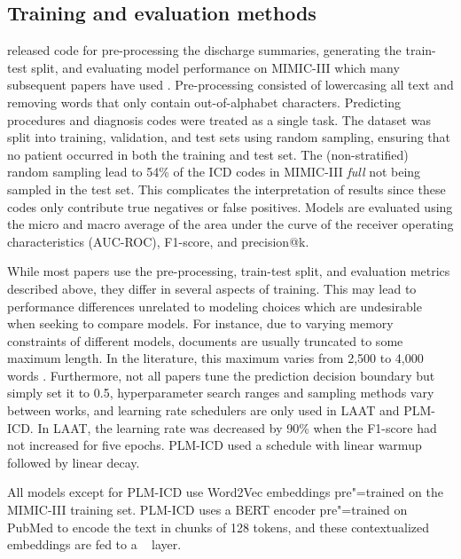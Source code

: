 {\subsection{Training and evaluation methods}\label{sec: training and evaluation methods}

\textcite{mullenbachExplainablePredictionMedical2018} released code for pre-processing the discharge summaries, generating the train-test split, and evaluating model performance on MIMIC-III which many subsequent papers have used \parencite{vuLabelAttentionModel2020, huangPLMICDAutomaticICD2022, liICDCodingClinical2020, baoMedicalCodePrediction2021, yuanCodeSynonymsMatter2022, kimReadAttendCode2021}.
Pre-processing consisted of lowercasing all text and removing words that only contain out-of-alphabet characters. Predicting procedures and diagnosis codes were treated as a single task.
The dataset was split into training, validation, and test sets using random sampling, ensuring that no patient occurred in both the training and test set. The (non-stratified) random sampling lead to 54\% of the ICD codes in MIMIC-III \textit{full} not being sampled in the test set. This complicates the interpretation of results since these codes only contribute true negatives or false positives. 
Models are evaluated using the micro and macro average of the area under the curve of the receiver operating characteristics (AUC-ROC), F1-score, and precision@k. 

While most papers use the pre-processing, train-test split, and evaluation metrics described above, they differ in several aspects of training. This may lead to performance differences unrelated to modeling choices which are undesirable when seeking to compare models. 
For instance, due to varying memory constraints of different models, documents are usually truncated to some maximum length. In the literature, this maximum varies from 2,500 to 4,000 words \parencite{mullenbachExplainablePredictionMedical2018, vuLabelAttentionModel2020, huangPLMICDAutomaticICD2022}.
Furthermore, not all papers tune the prediction decision boundary but simply set it to 0.5,
 hyperparameter search ranges and sampling methods  vary between works, and learning rate schedulers are only used in LAAT and PLM-ICD\parencite{mullenbachExplainablePredictionMedical2018, liICDCodingClinical2020}. In LAAT, the learning rate was decreased by 90\% when the F1-score had not increased for five epochs. PLM-ICD used a schedule with linear warmup followed by linear decay. 

All models except for PLM-ICD use Word2Vec embeddings pre"=trained on the MIMIC-III training set. PLM-ICD uses a BERT encoder pre"=trained on PubMed to encode the text in chunks of 128 tokens, and these contextualized embeddings are fed to a \lalaat~ layer. 

}

